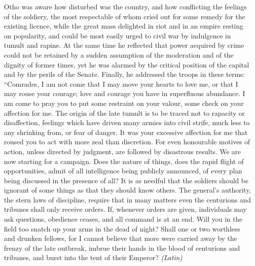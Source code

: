 Otho was aware how disturbed was the country, and how conflicting the feelings of the soldiery, the most respectable of whom cried out for some remedy for the existing licence, while the great mass delighted in riot and in an empire resting on popularity, and could be most easily urged to civil war by indulgence in tumult and rapine. At the same time he reflected that power acquired by crime could not be retained by a sudden assumption of the moderation and of the dignity of former times, yet he was alarmed by the critical position of the capital and by the perils of the Senate. Finally, he addressed the troops in these terms: ``Comrades, I am not come that I may move your hearts to love me, or that I may rouse your courage; love and courage you have in superfluous abundance. I am come to pray you to put some restraint on your valour, some check on your affection for me. The origin of the late tumult is to be traced not to rapacity or disaffection, feelings which have driven many armies into civil strife, much less to any shrinking from, or fear of danger. It was your excessive affection for me that roused you to act with more zeal than discretion. For even honourable motives of action, unless directed by judgment, are followed by disastrous results. We are now starting for a campaign. Does the nature of things, does the rapid flight of opportunities, admit of all intelligence being publicly announced, of every plan being discussed in the presence of all? It is as needful that the soldiers should be ignorant of some things as that they should know others. The general's authority, the stern laws of discipline, require that in many matters even the centurions and tribunes shall only receive orders. If, whenever orders are given, individuals may ask questions, obedience ceases, and all command is at an end. Will you in the field too snatch up your arms in the dead of night? Shall one or two worthless and drunken fellows, for I cannot believe that more were carried away by the frenzy of the late outbreak, imbrue their hands in the blood of centurions and tribunes, and burst into the tent of their Emperor? \emph{(Latin)}


